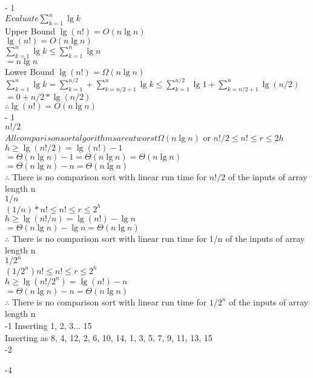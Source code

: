 \documentclass[12pt,largemargins]{homework}
\begin{document}
\maketitle

 - 1\\
$ Evaluate \sum_{k=1}^{n} \lg k $ \\
Upper Bound $ \lg (n!) = O(n \lg n) $\\
$ \lg (n!) = O(n \lg n)$ \\
$ \sum_{k=1}^{n} \lg k \leq \sum_{k=1}^{n} \lg n $\\
$ = n \lg n$\\
Lower Bound $ \lg (n!) = \Omega(n \lg n) $\\
$ \sum_{k=1}^{n} \lg k = \sum_{k=1}^{n/2} + \sum_{k=n/2 + 1}^{n} \lg k \leq \sum_{k=1}^{n/2} \lg 1 + \sum_{k=n/2+1}^{n} \lg (n/2) $\\
$ = 0 + n/2 * \lg(n/2)$ \\
$ \therefore \lg(n!) = O(n \lg n)$\\
 - 1\\
$ n! / 2 $\\
$ All comparison sort algorithms are at worst \Omega(n \lg n) $ or $ n!/2 \leq n! \leq r \leq 2h$\\
$ h \geq \lg(n!/2) = \lg(n!) - 1 $\\
$ = \Theta(n \lg n) -1 = \Theta(n \lg n) = \Theta(n \lg n)$ \\
$ =\Theta(n \lg n) -n = \Theta(n \lg n)$\\
$ \therefore $ There is no comparison sort with linear run time for $ n!/2 $ of the inputs of array length n \\
$ 1/n $\\
$ (1/n)*n! \leq n! \leq r \leq 2^h $\\
$ h \geq \lg(n!/n) = \lg(n!) - \lg n$\\
$ =\Theta(n \lg n) - \lg n = \Theta(n \lg n)$\\
$ \therefore $ There is no comparison sort with linear run time for 1/n of the inputs of array length n \\
$ 1/2 ^ n $\\
$ (1/2^n)n! \leq n! \leq r \leq 2^h $\\
$ h \geq \lg( n!/2^n ) = \lg(n!) -n $\\
$ =\Theta(n \lg n) -n = \Theta(n \lg n)$\\
$ \therefore $ There is no comparison sort with linear run time for $ 1/2^n $ of the inputs of array length n \\

-1
Inserting {1, 2, 3... 15}\\
Inserting as {8, 4, 12, 2, 6, 10, 14, 1, 3, 5, 7, 9, 11, 13, 15}\\

-2

-4
\end{document}
